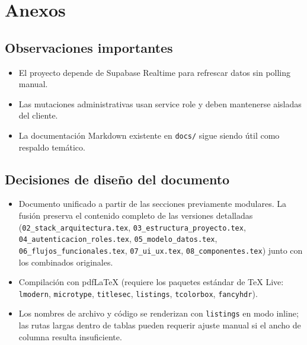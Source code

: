 \documentclass[12pt,a4paper,oneside]{report}
\newcommand{\file}[1]{\texttt{\color{cecyteDark}#1}}
\newcommand{\pkg}[1]{\texttt{#1}}
\begin{document}
\chapter{Anexos}

\section{Observaciones importantes}

\begin{itemize}
  \item El proyecto depende de Supabase Realtime para refrescar datos sin polling manual.
  \item Las mutaciones administrativas usan service role y deben mantenerse aisladas del cliente.
  \item La documentación Markdown existente en \file{docs/} sigue siendo útil como respaldo temático.
\end{itemize}

\section{Decisiones de diseño del documento}

\begin{itemize}
  \item Documento unificado a partir de las secciones previamente modulares. La fusión preserva el contenido completo de las versiones detalladas (\file{02\_stack\_arquitectura.tex}, \file{03\_estructura\_proyecto.tex}, \file{04\_autenticacion\_roles.tex}, \file{05\_modelo\_datos.tex}, \file{06\_flujos\_funcionales.tex}, \file{07\_ui\_ux.tex}, \file{08\_componentes.tex}) junto con los combinados originales.
  \item Compilación con pdfLaTeX (requiere los paquetes estándar de TeX Live: \pkg{lmodern}, \pkg{microtype}, \pkg{titlesec}, \pkg{listings}, \pkg{tcolorbox}, \pkg{fancyhdr}).
  \item Los nombres de archivo y código se renderizan con \pkg{listings} en modo inline; las rutas largas dentro de tablas pueden requerir ajuste manual si el ancho de columna resulta insuficiente.
\end{itemize}
\end{document}
